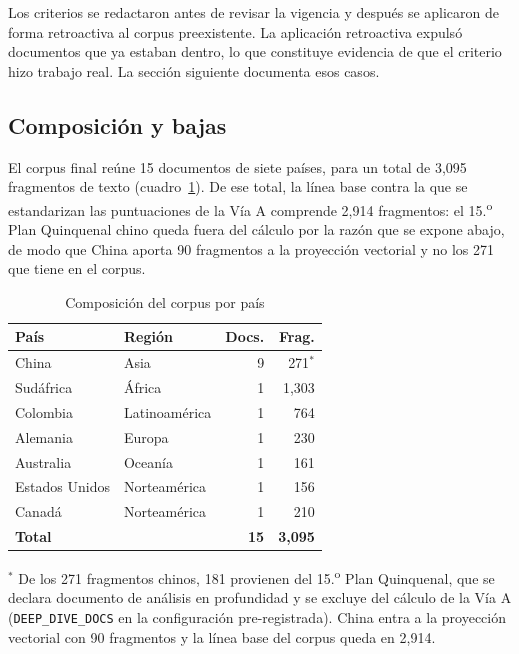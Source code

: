 Los criterios se redactaron antes de revisar la vigencia y después se aplicaron de forma retroactiva al corpus preexistente. La aplicación retroactiva expulsó documentos que ya estaban dentro, lo que constituye evidencia de que el criterio hizo trabajo real. La sección siguiente documenta esos casos.

\subsection{Composición y bajas}

El corpus final reúne 15 documentos de siete países, para un total de 3{,}095 fragmentos de texto (cuadro~\ref{tab:corpus}). De ese total, la línea base contra la que se estandarizan las puntuaciones de la Vía A comprende 2{,}914 fragmentos: el 15.\textsuperscript{o} Plan Quinquenal chino queda fuera del cálculo por la razón que se expone abajo, de modo que China aporta 90 fragmentos a la proyección vectorial y no los 271 que tiene en el corpus.

\begin{table}[htbp]
\centering
\caption{Composición del corpus por país}
\label{tab:corpus}
\begin{tabular}{llrr}
\hline
\textbf{País} & \textbf{Región} & \textbf{Docs.} & \textbf{Frag.} \\
\hline
China & Asia & 9 & 271$^{\ast}$ \\
Sudáfrica & África & 1 & 1{,}303 \\
Colombia & Latinoamérica & 1 & 764 \\
Alemania & Europa & 1 & 230 \\
Australia & Oceanía & 1 & 161 \\
Estados Unidos & Norteamérica & 1 & 156 \\
Canadá & Norteamérica & 1 & 210 \\
\hline
\textbf{Total} & & \textbf{15} & \textbf{3{,}095} \\
\hline
\end{tabular}
\vspace{0.3em}
{\footnotesize\par\noindent$^{\ast}$ De los 271 fragmentos chinos, 181 provienen del 15.\textsuperscript{o} Plan Quinquenal, que se declara documento de análisis en profundidad y se excluye del cálculo de la Vía A (\texttt{DEEP\_DIVE\_DOCS} en la configuración pre-registrada). China entra a la proyección vectorial con 90 fragmentos y la línea base del corpus queda en 2{,}914.}
\end{table}

